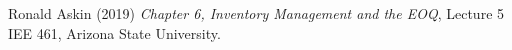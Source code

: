 \documentclass{article}
\begin{document}



 \begin{thebibliography}{1}

 	Ronald Askin (2019) \emph{Chapter 6, Inventory Management and the EOQ}, Lecture 5 IEE 461, Arizona State University.

 \end{thebibliography}
\end{document}
